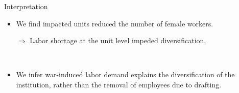 \begin{frame}{Interpretation}
    \begin{itemize}
        \item We find impacted units reduced the number of female workers.

        $\Rightarrow$ Labor shortage at the unit level impeded diversification.

        \

        \item We infer war-induced  labor demand explains the diversification of the institution, rather than the removal of employees  due to drafting.
    \end{itemize}
\end{frame}